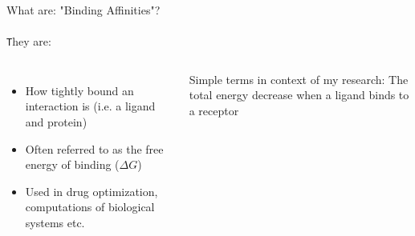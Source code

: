 \documentclass{beamer}
\begin{document}
\begin{frame}{What are: "Binding Affinities"?}
  \framesubtitle{}

  \texttt They are:

  \begin{columns}
      \begin{itemize}
        \item How tightly bound an interaction is (i.e. a ligand and protein) 
        \item Often referred to as the free energy of binding ($\Delta G$)
        \item Used in drug optimization, computations of biological systems etc.
      \end{itemize}

      \begin{block}{Simple terms in context of my research:}
         The total energy decrease when a ligand binds to a receptor
      \end{block}
  \end{columns}
  
\end{frame}
\end{document}
